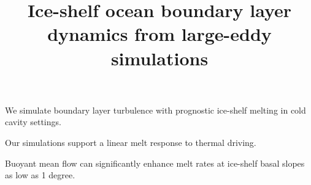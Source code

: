\documentclass[draft]{agujournal2019}
\begin{document}
\title{Ice-shelf ocean boundary layer dynamics from large-eddy simulations}

	

\begin{keypoints}
\item We simulate boundary layer turbulence with prognostic ice-shelf melting
in cold cavity settings.
\item Our simulations support a linear melt response to thermal driving.
\item Buoyant mean flow can significantly enhance melt rates at ice-shelf basal slopes as low as 1 degree.
\end{keypoints}
\end{document}
